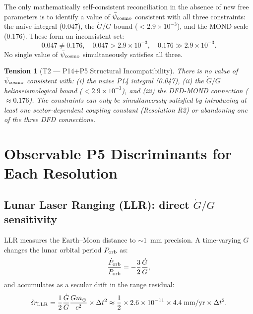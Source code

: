 \documentclass[aps,prd,twocolumn,superscriptaddress,nofootinbib,longbibliography]{revtex4-2}
\newcommand{\psibar}{\bar{\psi}}
\newcommand{\ee}[1]{\times 10^{#1}}
\newtheorem{tension}{Tension}
\begin{document}
The only mathematically self-consistent reconciliation in the absence of
new free parameters is to identify a value of $\psibar_{\rm cosmo}$ consistent
with all three constraints: the naive integral (0.047), the $\dot{G}/G$ bound
($< 2.9\ee{-3}$), and the MOND scale (0.176).  These form an inconsistent
set:
\begin{equation}
0.047 \neq 0.176, \quad 0.047 > 2.9\ee{-3}, \quad 0.176 \gg 2.9\ee{-3}.
\end{equation}
No single value of $\psibar_{\rm cosmo}$ simultaneously satisfies all three.

\begin{tension}[T2 --- P14+P5 Structural Incompatibility]
\label{ten:T2}
There is no value of $\psibar_{\rm cosmo}$ consistent with:
(i) the naive P14 integral (0.047),
(ii) the $\dot{G}/G$ helioseismological bound ($< 2.9\ee{-3}$), and
(iii) the DFD-MOND connection ($\approx 0.176$).
The constraints can only be simultaneously satisfied by introducing at least
one sector-dependent coupling constant (Resolution R2) or abandoning one
of the three DFD connections.
\end{tension}

\section{Observable P5 Discriminants for Each Resolution}
\label{sec:observables}

\subsection{Lunar Laser Ranging (LLR): direct $\dot{G}/G$ sensitivity}

LLR measures the Earth--Moon distance to $\sim\!1$~mm precision.  A time-varying
$G$ changes the lunar orbital period $P_{\rm orb}$ as:
\begin{equation}
\frac{\dot{P}_{\rm orb}}{P_{\rm orb}} = -\frac{3}{2}\frac{\dot{G}}{G},
\label{eq:LLR-Porb}
\end{equation}
and accumulates as a secular drift in the range residual:
\begin{equation}
\delta r_{\rm LLR} = \frac{1}{2}\frac{\dot{G}}{G}\frac{Gm_\oplus}{c^2}
\times\Delta t^2 \approx \frac{1}{2}\times 2.6\ee{-11}\times 4.4\;\text{mm/yr}
\times\Delta t^2.
\label{eq:LLR-drift}
\end{equation}
\end{document}
